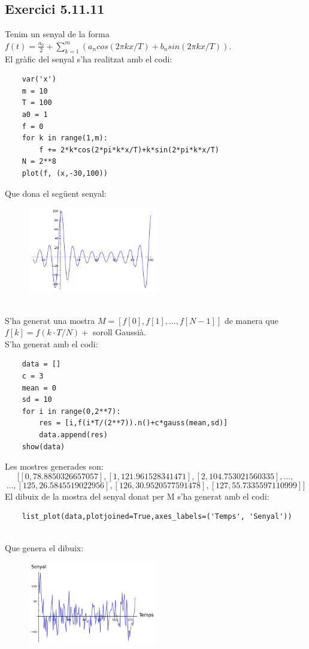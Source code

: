 \documentclass[a4paper, 11pt]{article}
\begin{document}
\subsection{Exercici 5.11.11}
Tenim un senyal de la forma $f(t) = \frac{a_0}{2} + \sum_{k=1}^m (a_n cos(2\pi kx/T) + b_n sin(2\pi kx/T))$.\\
El gràfic del senyal s'ha realitzat amb el codi:
\small
\begin{verbatim}
    var('x')
    m = 10
    T = 100
    a0 = 1
    f = 0
    for k in range(1,m):
        f += 2*k*cos(2*pi*k*x/T)+k*sin(2*pi*k*x/T)
    N = 2**8
    plot(f, (x,-30,100))
\end{verbatim}
Que dona el següent senyal:
\begin{figure}[h]
\centering
 \includegraphics[width=0.5\textwidth]{meter1.png}
\end{figure}\\
S'ha generat una mostra $M = [f[0], f[1], ..., f[N-1]]$ de manera que $f[k]=f(k\cdot T/N) +$ soroll Gaussià.\\
S'ha generat amb el codi:
\begin{verbatim}
    data = []
    c = 3
    mean = 0
    sd = 10
    for i in range(0,2**7):
        res = [i,f(i*T/(2**7)).n()+c*gauss(mean,sd)]
        data.append(res)
    show(data)
\end{verbatim}
Les mostres generades son: 
$$[[0,78.8850326657057],[1,121.961528341471],[2,104.753021560335], ..., $$ $$ ..., [125,26.5845519022956],[126,30.9520577591478],[127,55.7335597110999]] $$
El dibuix de la mostra del senyal donat per M s'ha generat amb el codi:
\begin{verbatim}
    list_plot(data,plotjoined=True,axes_labels=('Temps', 'Senyal'))
\end{verbatim}\\
Que genera el dibuix:
\begin{figure}[h]
\centering
 \includegraphics[width=0.5\textwidth]{meter2.png}
\end{figure}\\
\end{document}
